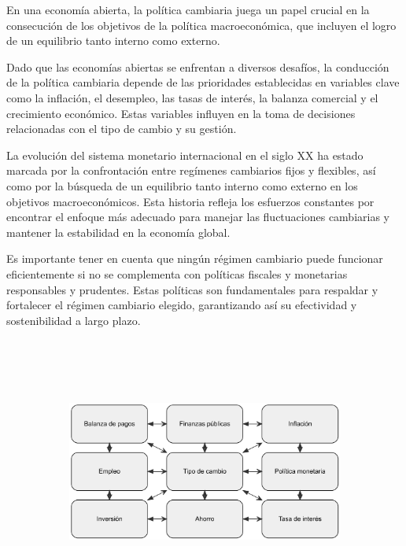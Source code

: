\documentclass[
  a4paper,
]{article}
\begin{document}
En una economía abierta, la política cambiaria juega un papel crucial en
la consecución de los objetivos de la política macroeconómica, que
incluyen el logro de un equilibrio tanto interno como externo.

Dado que las economías abiertas se enfrentan a diversos desafíos, la
conducción de la política cambiaria depende de las prioridades
establecidas en variables clave como la inflación, el desempleo, las
tasas de interés, la balanza comercial y el crecimiento económico. Estas
variables influyen en la toma de decisiones relacionadas con el tipo de
cambio y su gestión.

La evolución del sistema monetario internacional en el siglo XX ha
estado marcada por la confrontación entre regímenes cambiarios fijos y
flexibles, así como por la búsqueda de un equilibrio tanto interno como
externo en los objetivos macroeconómicos. Esta historia refleja los
esfuerzos constantes por encontrar el enfoque más adecuado para manejar
las fluctuaciones cambiarias y mantener la estabilidad en la economía
global.

Es importante tener en cuenta que ningún régimen cambiario puede
funcionar eficientemente si no se complementa con políticas fiscales y
monetarias responsables y prudentes. Estas políticas son fundamentales
para respaldar y fortalecer el régimen cambiario elegido, garantizando
así su efectividad y sostenibilidad a largo plazo.

\begin{figure}

\caption{\label{fig-2}Interrelaciones entre tipo de cambio, variables y
políticas económicas}

{\centering 

\begin{figure}[H]

{\centering \includegraphics[width=5.5in,height=3.5in]{index_files/figure-latex/dot-figure-2.png}

}

\end{figure}

}

\end{figure}
\end{document}
